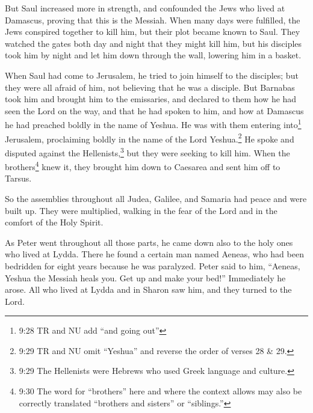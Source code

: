 \myverse{}But Saul increased more in strength, and confounded the Jews
who lived at Damascus, proving that this is the Messiah.
\myverse{}When many days were fulfilled, the Jews conspired together to kill him,
\myverse{}but their plot became known to Saul. They watched the gates both day and night
that they might kill him,
\myverse{}but his disciples took him by night and let him down through the wall, lowering
him in a basket.

\myverse{}When Saul had come to Jerusalem, he tried to join himself to
the disciples; but they were all afraid of him, not believing that he was a disciple.
\myverse{}But Barnabas took him and brought him to the emissaries, and declared to them
how he had seen the Lord on the way, and that he had spoken to him, and how at Damascus he had preached
boldly in the name of Yeshua.
\myverse{}He was with them entering into\footnote{9:28 TR and NU add “and going out”
} Jerusalem,
\myverse{}proclaiming boldly in the name of the Lord Yeshua.\footnote{9:29 TR and NU omit “Yeshua” and reverse the order of verses 28 \& 29.} He spoke and disputed
against the Hellenists,\footnote{9:29 The Hellenists were Hebrews who used Greek language and culture.} but they were seeking
to kill him.
\myverse{}When the brothers\footnote{9:30 The word for “brothers” here and where the context allows may also be correctly translated “brothers
	and sisters” or “siblings.”
} knew it, they brought him down to Caesarea and sent him off to Tarsus.

\myverse{}So the assemblies throughout all Judea, Galilee, and Samaria
had peace and were built up. They were multiplied, walking in the fear of the Lord and in the comfort
of the Holy Spirit.

\myverse{}As Peter went throughout all those parts, he came down also to
the holy ones who lived at Lydda.
\myverse{}There he found a certain man named Aeneas, who had been bedridden for eight
years because he was paralyzed.
\myverse{}Peter said to him, “Aeneas, Yeshua the Messiah heals you. Get up and make
your bed!” Immediately he arose.
\myverse{}All who lived at Lydda and in Sharon saw him, and they turned to the Lord.

